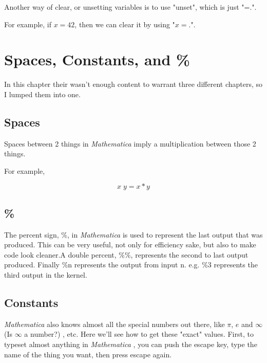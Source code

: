 \documentclass[11pt,letterpaper,twoside,titlepage]{report}
\newcommand{\Mathematica}{\textit{Mathematica} }
\begin{document}
						Another way of clear, or unsetting variables is to use "unset", which is just "=.".  
						
						For example, if $ x = 42 $, then we can clear it by using "$x=.$".
	
		\chapter{Spaces, Constants, and \%}
		
			In this chapter their wasn't enough content to warrant three different chapters, so I lumped them into one.
		
			\section{Spaces}
						
				Spaces between 2 things in \Mathematica imply a multiplication between those 2 things.
						
				For example,
						
				\[ x \; y = x*y \]
			
			\section{\%}
			
				The percent sign, \%, in \Mathematica is used to represent the last output that was produced.  This can be very useful, not only for efficiency sake, but also to make code look cleaner.A double percent, \%\%, represents the second to last output produced.  Finally \%n represents the output from input n.  e.g. \%3 represents the third output in the kernel. 
				
			\section{Constants}
			
				\Mathematica also knows almost all the special numbers out there, like $\pi$, $e$ and $\infty$ (Is $\infty$ a number?) , etc.  Here we'll see how to get these "exact" values.  First, to typeset almost anything in \Mathematica, you can push the escape key, type the name of the thing you want, then press escape again.
				
\end{document}
